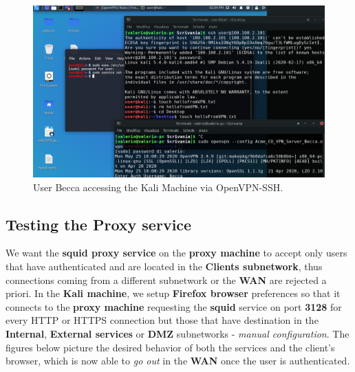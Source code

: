 \begin{figure}[!htb]
\centering
\begin{minipage}{.80\textwidth}
  \centering
  \includegraphics[width=1\textwidth]{OVPNaccessViaSSH.png}
  \caption[a]{User Becca accessing the Kali Machine via OpenVPN-SSH.}\label{fig:8}
\end{minipage}%
\end{figure}

\subsection{Testing the Proxy service}
We want the \textbf{squid proxy service} on the \textbf{proxy machine} to accept only users that have authenticated and are located in the \textbf{Clients subnetwork}, thus connections coming from a different subnetwork or the \textbf{WAN} are rejected a priori. In the \textbf{Kali machine}, we setup \textbf{Firefox browser} preferences so that it connects to the \textbf{proxy machine} requesting the \textbf{squid} service on port \textbf{3128} for every HTTP or HTTPS connection but those that have destination in the \textbf{Internal}, \textbf{External services} or \textbf{DMZ} subnetworks - \textit{manual configuration}. The figures below picture the desired behavior of both the services and the client's browser, which is now able to \textit{go out} in the \textbf{WAN} once the user is authenticated.\\

